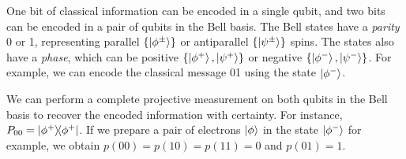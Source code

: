 One bit of classical information can be encoded in a single qubit, and two bits can be encoded in a pair of qubits in the Bell basis.
The Bell states have a \emph{parity} 0 or 1, representing parallel \( \qty{\ket{\phi^\pm}} \) or antiparallel \( \qty{\ket{\psi^\pm}} \) spins.
The states also have a \emph{phase}, which can be positive \( \qty{\ket{\phi^+}, \ket{\psi^+}} \) or negative \( \qty{\ket{\phi^-}, \ket{\psi^-}} \).
For example, we can encode the classical message 01 using the state \( \ket{\phi^-} \).

We can perform a complete projective measurement on both qubits in the Bell basis to recover the encoded information with certainty.
For instance, \( P_{00} = \op{\phi^+}{\phi^+} \).
If we prepare a pair of electrons \( \ket{\phi} \) in the state \( \ket{\phi^-} \) for example, we obtain \( p(00) = p(10) = p(11) = 0 \) and \( p(01) = 1 \).
